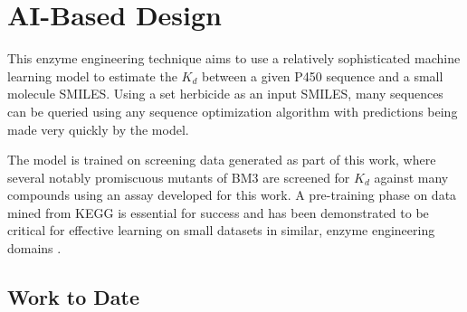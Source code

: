 \documentclass{article}
\begin{document}
\section{AI-Based Design}
This enzyme engineering technique aims to  use a relatively sophisticated machine learning model to estimate the $K_d$ between a given P450 sequence and a small molecule SMILES. Using a set herbicide as an input SMILES, many sequences can be queried using any sequence optimization algorithm with predictions being made very quickly by the model.
\par 
The model is trained on screening data generated as part of this work, where several notably promiscuous mutants of BM3 are screened for $K_d$ against many compounds using an assay developed for this work. A pre-training phase on data mined from KEGG is essential for success and has been demonstrated to be critical for effective learning on small datasets in similar, enzyme engineering domains \cite{biswas2021low}.

\subsection{Work to Date}
\end{document}
